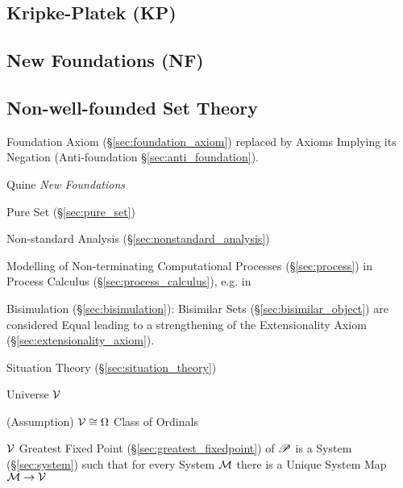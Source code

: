 \subsection{Kripke-Platek (KP)}\label{sec:kripke_platek}

\subsection{New Foundations (NF)}\label{sec:quine_foundations}

\subsection{Non-well-founded Set Theory}\label{sec:non_wellfounded}

\cite{aczel88}

Foundation Axiom (\S\ref{sec:foundation_axiom}) replaced by Axioms
Implying its Negation (Anti-foundation \S\ref{sec:anti_foundation}).

Quine \emph{New Foundations}

Pure Set (\S\ref{sec:pure_set})

Non-standard Analysis (\S\ref{sec:nonstandard_analysis})

Modelling of Non-terminating Computational Processes
(\S\ref{sec:process}) in Process Calculus
(\S\ref{sec:process_calculus}), e.g. in
\cite{abramsky-gay-nagarajan96}

Bisimulation (\S\ref{sec:bisimulation}): Bisimilar Sets
(\S\ref{sec:bisimilar_object}) are considered Equal leading to a
strengthening of the Extensionality Axiom
(\S\ref{sec:extensionality_axiom}).

Situation Theory (\S\ref{sec:situation_theory})

Universe $\mathcal{V}$

(Assumption) $\mathcal{V} \cong \Omega$ Class of Ordinals

$\mathcal{V}$ Greatest Fixed Point (\S\ref{sec:greatest_fixedpoint}) of
$\mathscr{P}$ is a System (\S\ref{sec:system}) such that for every System
$\mathcal{M}$ there is a Unique System Map $\mathcal{M} \to
\mathcal{V}$

